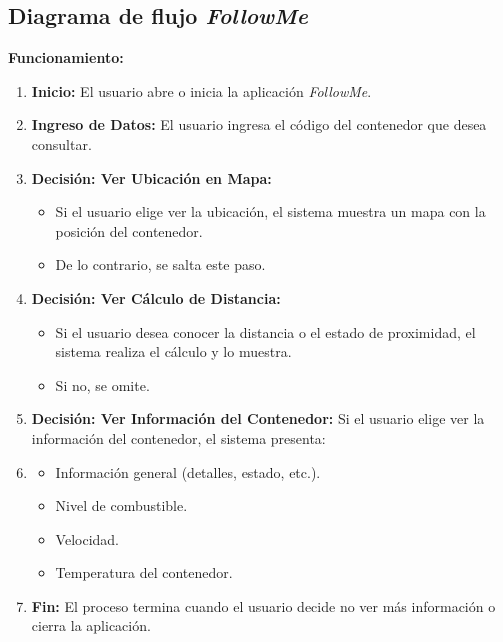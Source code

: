 \documentclass[protocolo.tex]{subfiles}
\begin{document}
\subsection{Diagrama de flujo \textit{FollowMe}} 
\textbf{Funcionamiento:}
\begin{enumerate}
    \item \textbf{Inicio:}  
    El usuario abre o inicia la aplicación \textit{FollowMe}.
    \item \textbf{Ingreso de Datos:}  
    El usuario ingresa el código del contenedor que desea consultar.
    \item \textbf{Decisión: Ver Ubicación en Mapa:}  
    \begin{itemize}
        \item Si el usuario elige ver la ubicación, el sistema muestra un mapa con la posición del contenedor.
        \item De lo contrario, se salta este paso.
    \end{itemize}
    \item \textbf{Decisión: Ver Cálculo de Distancia:} 
    \begin{itemize}
        \item Si el usuario desea conocer la distancia o el estado de proximidad, el sistema realiza el cálculo y lo muestra.
        \item Si no, se omite.
    \end{itemize}
    \item \textbf{Decisión: Ver Información del Contenedor:} 
    Si el usuario elige ver la información del contenedor, el sistema presenta:
    \item \begin{itemize}
        \item Información general (detalles, estado, etc.).
        \item Nivel de combustible.
        \item Velocidad.
        \item Temperatura del contenedor.
    \end{itemize}
    \item \textbf{Fin:} 
    El proceso termina cuando el usuario decide no ver más información o cierra la aplicación.
\end{enumerate}
\end{document}
